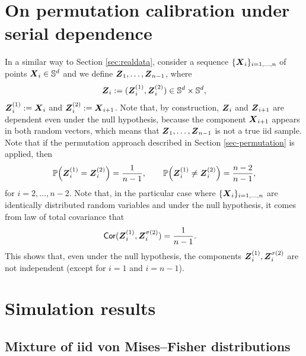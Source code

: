 \documentclass[oneside,11pt]{article}
\begin{document}
\section{On permutation calibration under serial dependence}
\label{app:permutation_serial}

In a similar way to Section \ref{sec:realdata}, consider a sequence $\{ \boldsymbol{X}_i \}_{i = 1, \dots, n}$ of points $\boldsymbol{X}_i \in \mathbb{S}^{d}$ and we define $\boldsymbol{Z}_1, \dots, \boldsymbol{Z}_{n-1}$, where
\begin{align*}
    \boldsymbol{Z}_i := (\boldsymbol{Z}_i^{(1)}, \boldsymbol{Z}_i^{(2)}) \in \mathbb{S}^{d} \times \mathbb{S}^{d},
\end{align*}
$\boldsymbol{Z}_i^{(1)} := \boldsymbol{X}_i$ and $\boldsymbol{Z}_i^{(2)} := \boldsymbol{X}_{i+1}$. Note that, by construction, $\boldsymbol{Z}_i$ and $\boldsymbol{Z}_{i+1}$ are dependent even under the null hypothesis, because the component $\boldsymbol{X}_{i+1}$ appears in both random vectors, which means that $\boldsymbol{Z}_1, \dots, \boldsymbol{Z}_{n-1}$ is not a true iid sample. Note that if the permutation approach described in Section \ref{sec-permutation} is applied, then
\[
\mathbb{P}\!\left(\boldsymbol{Z}_i^{(1)} = \boldsymbol{Z}_i^{(2)}\right) = \frac{1}{n-1},
\qquad
\mathbb{P}\!\left(\boldsymbol{Z}_i^{(1)} \neq \boldsymbol{Z}_i^{(2)}\right) = \frac{n-2}{n-1},
\]
for $i = 2, \dots, n-2$. Note that, in the particular case where $\{ \boldsymbol{X}_i \}_{i = 1, \dots, n}$ are identically distributed random variables and under the null hypothesis, it comes from law of total covariance that
\begin{align*}
    \mathsf{Cor}(\boldsymbol{Z}_i^{(1)}, \boldsymbol{Z}_i^{\sigma(2)}) &= \frac{1}{n-1}.
\end{align*}
This shows that, even under the null hypothesis, the components $\boldsymbol{Z}_i^{(1)}, \boldsymbol{Z}_i^{\sigma(2)}$ are not independent (except for $i=1$ and $i = n-1$).

\section{Simulation results}\label{sec:simultation_tables}

\subsection{Mixture of iid von Mises--Fisher distributions}
\end{document}

